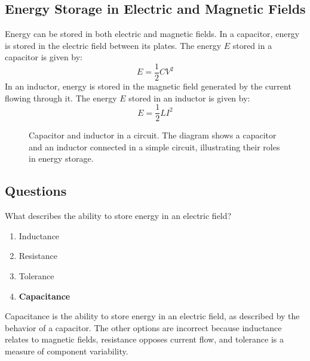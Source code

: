 \subsection*{Energy Storage in Electric and Magnetic Fields}
Energy can be stored in both electric and magnetic fields. In a capacitor, energy is stored in the electric field between its plates. The energy \( E \) stored in a capacitor is given by:
\begin{equation}
    E = \frac{1}{2}CV^2
\end{equation}
In an inductor, energy is stored in the magnetic field generated by the current flowing through it. The energy \( E \) stored in an inductor is given by:
\begin{equation}
    E = \frac{1}{2}LI^2
\end{equation}

\begin{figure}[h]
    \centering
    \caption{Capacitor and inductor in a circuit. The diagram shows a capacitor and an inductor connected in a simple circuit, illustrating their roles in energy storage.}
    \label{fig:capacitor_inductor}
\end{figure}

\subsection*{Questions}
\begin{tcolorbox}[colback=gray!10!white,colframe=black!75!black,title={T5C01}]
    What describes the ability to store energy in an electric field?
    \begin{enumerate}[label=\Alph*),noitemsep]
        \item Inductance
        \item Resistance
        \item Tolerance
        \item \textbf{Capacitance}
    \end{enumerate}
\end{tcolorbox}
Capacitance is the ability to store energy in an electric field, as described by the behavior of a capacitor. The other options are incorrect because inductance relates to magnetic fields, resistance opposes current flow, and tolerance is a measure of component variability.

